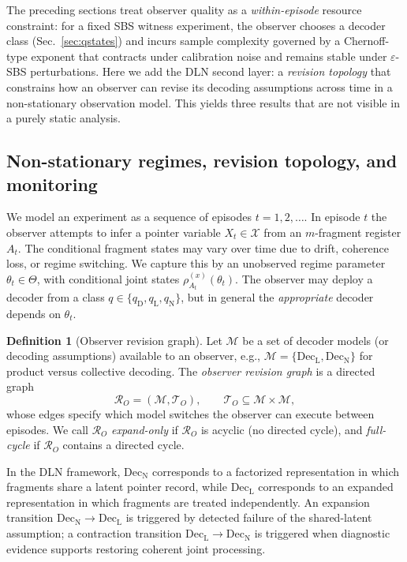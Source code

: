 \documentclass[11pt]{article}
\newcommand{\cX}{\mathcal{X}}
\newcommand{\cR}{\mathcal{R}}
\newcommand{\1}{\mathbf{1}}
\theoremstyle{definition}
\newtheorem{definition}{Definition}
\theoremstyle{plain}
\begin{document}
The preceding sections treat observer quality as a \emph{within-episode} resource constraint: for a fixed SBS witness experiment, the observer chooses a decoder class (Sec.~\ref{sec:qstates}) and incurs sample complexity governed by a Chernoff-type exponent that contracts under calibration noise and remains stable under $\varepsilon$-SBS perturbations.
Here we add the DLN second layer: a \emph{revision topology} that constrains how an observer can revise its decoding assumptions across time in a non-stationary observation model.
This yields three results that are not visible in a purely static analysis.

\subsection{Non-stationary regimes, revision topology, and monitoring}

We model an experiment as a sequence of episodes $t=1,2,\dots$.
In episode $t$ the observer attempts to infer a pointer variable $X_t\in\cX$ from an $m$-fragment register $A_t$.
The conditional fragment states may vary over time due to drift, coherence loss, or regime switching.
We capture this by an unobserved regime parameter $\theta_t\in\Theta$, with conditional joint states
$\rho_{A_t}^{(x)}(\theta_t)$.
The observer may deploy a decoder from a class $q\in\{q_{\mathrm{D}},q_{\mathrm{L}},q_{\mathrm{N}}\}$, but in general the \emph{appropriate} decoder depends on $\theta_t$.

\begin{definition}[Observer revision graph]
\label{def:revision-graph-q}
Let $\mathcal{M}$ be a set of decoder models (or decoding assumptions) available to an observer, e.g.,
$\mathcal{M}=\{\mathrm{Dec}_{\mathrm{L}},\mathrm{Dec}_{\mathrm{N}}\}$ for product versus collective decoding.
The \emph{observer revision graph} is a directed graph
\[
\cR_O=(\mathcal{M},\mathcal{T}_O),
\qquad
\mathcal{T}_O\subseteq \mathcal{M}\times\mathcal{M},
\]
whose edges specify which model switches the observer can execute between episodes.
We call $\cR_O$ \emph{expand-only} if $\cR_O$ is acyclic (no directed cycle), and \emph{full-cycle} if $\cR_O$ contains a directed cycle.
\end{definition}

In the DLN framework, $\mathrm{Dec}_{\mathrm{N}}$ corresponds to a factorized representation in which fragments share a latent pointer record, while $\mathrm{Dec}_{\mathrm{L}}$ corresponds to an expanded representation in which fragments are treated independently.
An expansion transition $\mathrm{Dec}_{\mathrm{N}}\to \mathrm{Dec}_{\mathrm{L}}$ is triggered by detected failure of the shared-latent assumption; a contraction transition $\mathrm{Dec}_{\mathrm{L}}\to \mathrm{Dec}_{\mathrm{N}}$ is triggered when diagnostic evidence supports restoring coherent joint processing.
\end{document}

